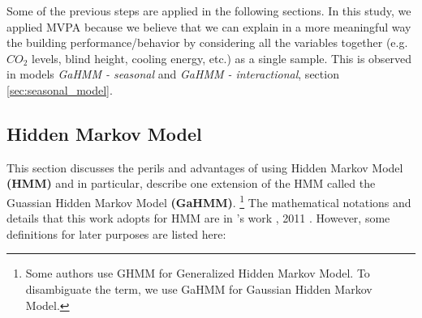 Some of the previous steps are applied in the following sections. In this study, we applied MVPA because we believe that we can explain in a more meaningful way the building performance/behavior by considering all the variables together (e.g. $CO_{2}$ levels, blind height, cooling energy, etc.) as a single sample. This is observed in models \textit{GaHMM - seasonal} and \textit{GaHMM - interactional}, section \ref{sec:seasonal_model}.    
 
 

\subsection{Hidden Markov Model}
\label{sec:HHM}
This section discusses the perils and advantages of using Hidden Markov Model \textbf{(HMM)} and in particular, describe one extension of the HMM called the Guassian Hidden Markov Model \textbf{(GaHMM)}. \footnote{Some authors use GHMM for Generalized Hidden Markov Model. To disambiguate the term, we use GaHMM for Gaussian Hidden Markov Model.} The mathematical notations and details that this work adopts for HMM are in \citeauthor{pfundstein2011hidden}'s work , 2011 \cite{pfundstein2011hidden}. However, some definitions for later purposes are listed here:

